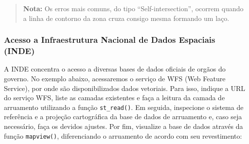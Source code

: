 \documentclass[
  letterpaper,
  DIV=11,
  numbers=noendperiod]{scrreprt}
\begin{document}
\begin{quote}
\textbf{Nota:} Os erros mais comuns, do tipo ``Self-intersection'',
ocorrem quando a linha de contorno da zona cruza consigo mesma formando
um laço.
\end{quote}

\subsubsection{\texorpdfstring{\textbf{Acesso a Infraestrutura Nacional
de Dados Espaciais
(INDE)}}{Acesso a Infraestrutura Nacional de Dados Espaciais (INDE)}}\label{acesso-a-infraestrutura-nacional-de-dados-espaciais-inde}

A INDE concentra o acesso a diversas bases de dados oficiais de orgãos
do governo. No exemplo abaixo, acessaremos o serviço de WFS (Web Feature
Service), por onde são disponibilizados dados vetoriais. Para isso,
indique a URL do serviço WFS, liste as camadas existentes e faça a
leitura da camada de arruamento utilizando a função \texttt{st\_read()}.
Em seguida, inspecione o sistema de referência e a projeção cartográfica
da base de dados de arruamento e, caso seja necessário, faça os devidos
ajustes. Por fim, visualize a base de dados através da função
\texttt{mapview()}, diferenciando o arruamento de acordo com seu
revestimento:
\end{document}
